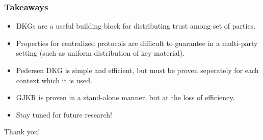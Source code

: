 \documentclass[hyperref={pdfpagelabels=true},table,dvipsnames,14pt,aspectratio=169]{beamer}
\begin{document}
\begin{frame}
  \frametitle{Takeaways}

  \begin{itemize}
    \item DKGs are a useful building block for distributing trust among set of parties.
    \item<2-> Properties for centralized protocols are difficult to guarantee in a multi-party setting (such as uniform distribution of key material).
    \item<3-> Pedersen DKG is simple and efficient, but must be proven seperately for each context which it is used.
    \item<4-> GJKR is proven in a stand-alone manner, but at the loss of efficiency.
    \item<5-> Stay tuned for future research!
  \end{itemize}
\end{frame}

\begin{frame}

  \huge
  \centering
  Thank you!
\end{frame}
\end{document}
